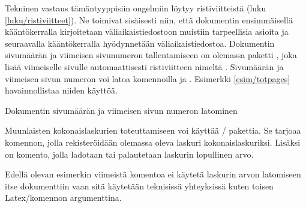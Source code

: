 Tekninen vastaus tämäntyyppisiin ongelmiin löytyy ristiviitteistä (luku
\ref{luku/ristiviitteet}). Ne toimivat sisäisesti niin, että dokumentin
ensimmäisellä kääntökerralla kirjoitetaan väliaikaistiedostoon muistiin
tarpeellisia asioita ja seuraavalla kääntökerralla hyödynnetään
väliaikaistiedostoa. Dokumentin sivumäärän ja viimeisen sivunumeron
tallentamiseen on olemassa paketti , joka lisää
viimeiselle sivulle automaattisesti ristiviitteen nimeltä
. Sivumäärän ja viimeisen sivun numeron voi latoa
komennoilla  ja . Esimerkki
\ref{esim/totpages} havainnollistaa niiden käyttöä.

\begin{esimerkki*}

  \caption{Dokumentin sivumäärän ja viimeisen sivun numeron latominen}
  \label{esim/totpages}
\end{esimerkki*}

Muunlaisten kokonaislaskurien toteuttamiseen voi käyttää
\-/ pakettia. Se tarjoaa komennon, jolla
rekisteröidään olemassa oleva laskuri kokonaislaskuriksi. Lisäksi on
komento, jolla ladotaan tai palautetaan laskurin lopullinen arvo.

\begin{koodilohkosis}
\addtocounter{oma}{1} %
\end{koodilohkosis}

\noindent
Edellä olevan esimerkin viimeistä komentoa  ei käytetä
laskurin arvon latomiseen itse dokumenttiin vaan sitä käytetään
teknisissä yhteyksissä kuten toisen Latex\-/komennon argumenttina.

